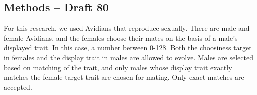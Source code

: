 \subsection{Methods – Draft 80}

For this research, we used Avidians that reproduce sexually. There are male and female Avidians, and the females choose their mates on the basis of a male’s displayed trait. In this case, a number between 0-128.
Both the choosiness target in females and the display trait in males are allowed to evolve. Males are selected based on matching of the trait, and only males whose display trait exactly matches the female target trait are chosen for mating. Only exact matches are accepted.